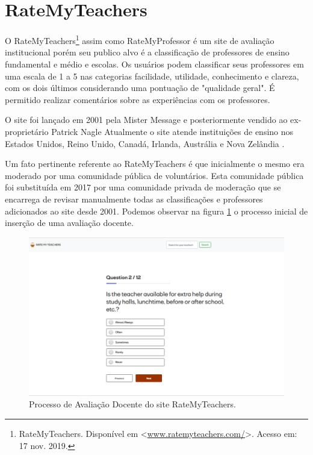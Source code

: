 \documentclass[12pt, a4paper]{report}
\begin{document}
\section{RateMyTeachers}

O RateMyTeachers\footnote{RateMyTeachers. Disponível em <\url{www.ratemyteachers.com/}>. Acesso em: 17 nov. 2019.} assim como RateMyProfessor é um site de avaliação institucional porém seu publico alvo é a classificação de professores de ensino fundamental e médio e escolas. Os usuários podem classificar seus professores em uma escala de 1 a 5 nas categorias facilidade, utilidade, conhecimento e clareza, com os dois últimos considerando uma pontuação de "qualidade geral". É permitido realizar comentários sobre as experiências com os professores.

O site foi lançado em 2001 pela Mister Message e posteriormente vendido ao ex-proprietário Patrick Nagle Atualmente o site atende instituições de ensino nos Estados Unidos, Reino Unido, Canadá, Irlanda, Austrália e Nova Zelândia .

Um fato pertinente referente ao RateMyTeachers é que inicialmente o mesmo era moderado por uma comunidade pública de voluntários. Esta comunidade pública foi substituída em 2017 por uma comunidade privada de moderação que se encarrega de revisar manualmente todas as classificações e professores adicionados ao site desde 2001. Podemos observar na figura \ref{fig:ratemyteacher} o processo inicial de inserção de uma avaliação docente.

\begin{figure}
\centering
\includegraphics[scale=0.45]{ratemyteachers.png}
\caption{Processo de Avaliação Docente do site RateMyTeachers.}
\label{fig:ratemyteacher}
\end{figure}
\end{document}
